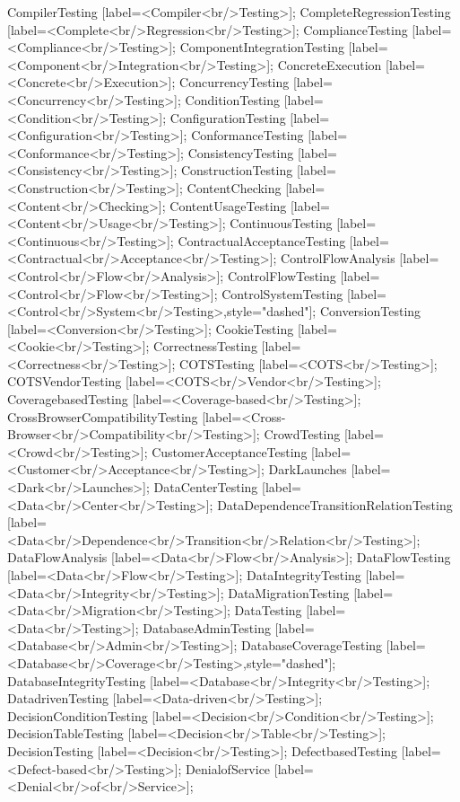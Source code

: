 \documentclass{article}
\begin{document}
{CompilerTesting [label=<Compiler<br/>Testing>];
CompleteRegressionTesting [label=<Complete<br/>Regression<br/>Testing>];
ComplianceTesting [label=<Compliance<br/>Testing>];
ComponentIntegrationTesting [label=<Component<br/>Integration<br/>Testing>];
ConcreteExecution [label=<Concrete<br/>Execution>];
ConcurrencyTesting [label=<Concurrency<br/>Testing>];
ConditionTesting [label=<Condition<br/>Testing>];
ConfigurationTesting [label=<Configuration<br/>Testing>];
ConformanceTesting [label=<Conformance<br/>Testing>];
ConsistencyTesting [label=<Consistency<br/>Testing>];
ConstructionTesting [label=<Construction<br/>Testing>];
ContentChecking [label=<Content<br/>Checking>];
ContentUsageTesting [label=<Content<br/>Usage<br/>Testing>];
ContinuousTesting [label=<Continuous<br/>Testing>];
ContractualAcceptanceTesting [label=<Contractual<br/>Acceptance<br/>Testing>];
ControlFlowAnalysis [label=<Control<br/>Flow<br/>Analysis>];
ControlFlowTesting [label=<Control<br/>Flow<br/>Testing>];
ControlSystemTesting [label=<Control<br/>System<br/>Testing>,style="dashed"];
ConversionTesting [label=<Conversion<br/>Testing>];
CookieTesting [label=<Cookie<br/>Testing>];
CorrectnessTesting [label=<Correctness<br/>Testing>];
COTSTesting [label=<COTS<br/>Testing>];
COTSVendorTesting [label=<COTS<br/>Vendor<br/>Testing>];
CoveragebasedTesting [label=<Coverage-based<br/>Testing>];
CrossBrowserCompatibilityTesting [label=<Cross-Browser<br/>Compatibility<br/>Testing>];
CrowdTesting [label=<Crowd<br/>Testing>];
CustomerAcceptanceTesting [label=<Customer<br/>Acceptance<br/>Testing>];
DarkLaunches [label=<Dark<br/>Launches>];
DataCenterTesting [label=<Data<br/>Center<br/>Testing>];
DataDependenceTransitionRelationTesting [label=<Data<br/>Dependence<br/>Transition<br/>Relation<br/>Testing>];
DataFlowAnalysis [label=<Data<br/>Flow<br/>Analysis>];
DataFlowTesting [label=<Data<br/>Flow<br/>Testing>];
DataIntegrityTesting [label=<Data<br/>Integrity<br/>Testing>];
DataMigrationTesting [label=<Data<br/>Migration<br/>Testing>];
DataTesting [label=<Data<br/>Testing>];
DatabaseAdminTesting [label=<Database<br/>Admin<br/>Testing>];
DatabaseCoverageTesting [label=<Database<br/>Coverage<br/>Testing>,style="dashed"];
DatabaseIntegrityTesting [label=<Database<br/>Integrity<br/>Testing>];
DatadrivenTesting [label=<Data-driven<br/>Testing>];
DecisionConditionTesting [label=<Decision<br/>Condition<br/>Testing>];
DecisionTableTesting [label=<Decision<br/>Table<br/>Testing>];
DecisionTesting [label=<Decision<br/>Testing>];
DefectbasedTesting [label=<Defect-based<br/>Testing>];
DenialofService [label=<Denial<br/>of<br/>Service>];
}
\end{document}
